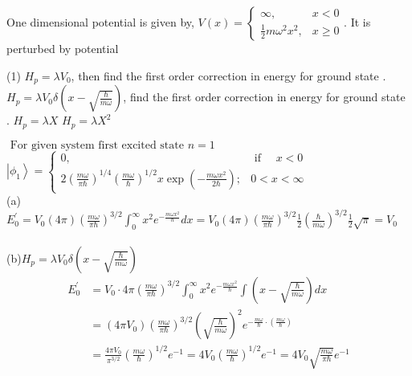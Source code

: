\begin{enumerate}
\begin{minipage}{\textwidth}
	\item
	One dimensional potential is given by, $V(x)=\left\{\begin{array}{ll}\infty, & x<0 \\ \frac{1}{2} m \omega^{2} x^{2}, & x \geq 0\end{array} .\right.$ It is perturbed by potential
	 \begin{tasks}(1)
		\task[\text{a.}] $H_{p}=\lambda V_{0}$, then find the first order correction in energy for ground state .
		\task[\text{b.}]$H_{p}=\lambda V_{0} \delta\left(x-\sqrt{\frac{\hbar}{m \omega}}\right)$, find the first order correction in energy for ground state .
		\task[\text{c.}] $H_{p}=\lambda X$
		\task[\text{d.}] $H_{p}=\lambda X^{2}$
	\end{tasks}
\end{minipage}
\begin{answer}
	$\text { For given system first excited state } n=1$\\
	$\left|\phi_{1}\right\rangle= \begin{cases}0, & \text { if } \quad x<0 \\ 2\left(\frac{m \omega}{\pi \hbar}\right)^{1 / 4}\left(\frac{m \omega}{\hbar}\right)^{1 / 2} x \exp \left(-\frac{m \omega x^{2}}{2 \hbar}\right) ; & 0<x<\infty\end{cases}$\\
(a)	$E_{0}^{\prime}=V_{0}(4 \pi)\left(\frac{m \omega}{\pi \hbar}\right)^{3 / 2 } \int_{0}^{\infty} x^2e^{-\frac{m \omega x^{2}}{\hbar}} d x=V_{0}(4 \pi)\left(\frac{m \omega}{\pi \hbar}\right)^{3 / 2} \frac{1}{2}\left(\frac{\hbar}{m \omega}\right)^{3 / 2} \frac{1}{2} \sqrt{\pi}=V_{0}$\\\\
(b)$H_{p}=\lambda V_{0} \delta\left(x-\sqrt{\frac{\hbar}{m \omega}}\right)$
\begin{align*}
E_{0}^{\prime}&=V_{0} \cdot 4 \pi\left(\frac{m \omega}{\pi \hbar}\right)^{3 / 2} \int_{0}^{\infty} x^{2} e^{-\frac{m \omega x^{2}}{\hbar}} \int\left(x-\sqrt{\frac{\hbar}{m \omega}}\right) d x\\
&=\left(4 \pi V_{0}\right)\left(\frac{m \omega}{\pi \hbar}\right)^{3 / 2}\left(\sqrt{\frac{\hbar}{m \omega}}\right)^{2} e^{-\frac{m \omega}{\hbar} \cdot\left(\frac{m \omega}{\hbar}\right)}\\
&=\frac{4 \pi V_{0}}{\pi^{3 / 2}}\left(\frac{m \omega}{\hbar}\right)^{1 / 2} e^{-1}=4 V_{0}\left(\frac{m \omega}{\hbar}\right)^{1 / 2} e^{-1}=4 V_{0} \sqrt{\frac{m \omega}{\pi \hbar}} e^{-1}
\end{align*}

\end{answer}
\end{enumerate}
